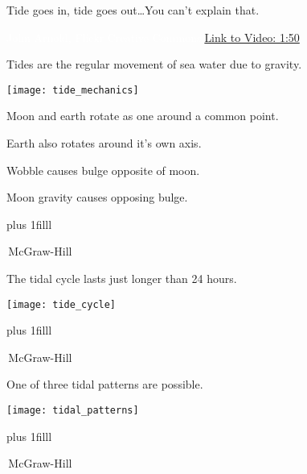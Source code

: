 \documentclass[t]{beamer}
\begin{document}

{
\begin{frame}[b]{Tide goes in, tide goes out\dots You can't explain that.}

\tiny\textcolor{white}{John Arnold, Flickr Creative Commons.\hfill\href{http://youtu.be/wb3AFMe2OQY}{Link to Video: 1:50}}
\end{frame}
}

\begin{frame}[t]{Tides are the regular movement of sea water due to gravity.}

\vspace*{-\baselineskip}

\begin{multicols}{2}

	\begin{center}
		\texttt{[image: tide\_mechanics]}
	\end{center}

\columnbreak

	\hangpara Moon and earth rotate as one around a common point.

	\hangpara Earth also rotates around it’s own axis.

	\hangpara Wobble causes bulge opposite of moon.

	\hangpara Moon gravity causes opposing bulge.
\end{multicols}

	\vskip0pt plus 1filll

	\tiny\textcopyright\,McGraw-Hill

\end{frame}


\begin{frame}[t]{The tidal cycle lasts just longer than 24 hours.}
	\vspace*{-\baselineskip}

	\begin{center}
		\texttt{[image: tide\_cycle]} 
	\end{center}

	\vskip0pt plus 1filll

	\tiny\textcopyright\,McGraw-Hill

\end{frame}

\begin{frame}[t]{One of three tidal patterns are possible.}

	\vspace*{-\baselineskip}

	\begin{center}
		\texttt{[image: tidal\_patterns]} 
	\end{center}

	\vskip0pt plus 1filll

	\tiny\textcopyright\,McGraw-Hill

\end{frame}
\end{document}
